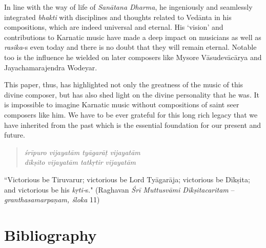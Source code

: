 In line with the way of life of \textit{Sanātana Dharma}, he ingeniously and seamlessly integrated \textit{bhakti} with disciplines and thoughts related to Vedānta in his compositions, which are indeed universal and eternal. His ‘vision’ and contributions to Karnatic music have made a deep impact on musicians as well as \textit{rasika}-s even today and there is no doubt that they will remain eternal. Notable too is the influence he wielded on later composers like Mysore Vāsudevācārya and Jayachamarajendra Wodeyar.

This paper, thus, has highlighted not only the greatness of the music of this divine composer, but has also shed light on the divine personality that he was. It is impossible to imagine Karnatic music without compositions of saint seer composers like him. We have to be ever grateful for this long rich legacy that we have inherited from the past which is the essential foundation for our present and future.

\vspace{-.3cm}

\begin{verse}
\textit{śrīpuro vijayatām tyāgarāṭ vijayatām} \\ \textit{dīkṣito vijayatām tatkṛtir vijayatām} 
\end{verse}

\vspace{-.3cm}

``Victorious be Tiruvarur; victorious be Lord Tyāgarāja; victorious be Dīkṣita; and victorious be his \textit{kṛti-}s." (Raghavan \textit{Śrī Muttusvāmi Dīkṣitacaritam} – \textit{granthasamarpaṇam, śloka} 11)


\section*{Bibliography}

